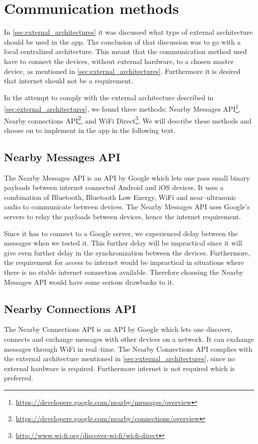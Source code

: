 \section{Communication methods}
In \cref{sec:external_architectures} it was discussed what type of external architecture should be used in the app.
The conclusion of that discussion was to go with a local centralized architecture.
This meant that the communication method used have to connect the devices, without external hardware, to a chosen master device, as mentioned in \cref{sec:external_architectures}.
Furthermore it is desired that internet should not be a requirement.

In the attempt to comply with the external architecture described in \cref{sec:external_architectures}, we found three methods: Nearby Messages API\footnote{\url{https://developers.google.com/nearby/messages/overview}}, Nearby connections API\footnote{\url{https://developers.google.com/nearby/connections/overview}}, and WiFi Direct\footnote{\url{http://www.wi-fi.org/discover-wi-fi/wi-fi-direct}}.
We will describe these methods and choose on to implement in the app in the following text.

\subsection{Nearby Messages API}
The Nearby Messages API is an API by Google which lets one pass small binary payloads between internet connected Android and iOS devices.
It uses a combination of Bluetooth, Bluetooth Low Energy, WiFi and near--ultrasonic audio to communicate between devices.
The Nearby Messages API uses Google's servers to relay the payloads between devices, hence the internet requirement.\cite{nearby_messages}

Since it has to connect to a Google server, we experienced delay between the messages when we tested it.
This further delay will be impractical since it will give even further delay in the synchronization between the devices.
Furthermore, the requirement for access to internet would be impractical in situations where there is no stable internet connection available.
Therefore choosing the Nearby Messages API would have some serious drawbacks to it.

\subsection{Nearby Connections API}
The Nearby Connections API is an API by Google which lets one discover, connects and exchange messages with other devices on a network.
It can exchange messages through WiFi in real--time.\cite{nearby_connection}
The Nearby Connections API complies with the external architecture mentioned in \cref{sec:external_architectures},
since no external hardware is required.
Furthermore internet is not required which is preferred.

